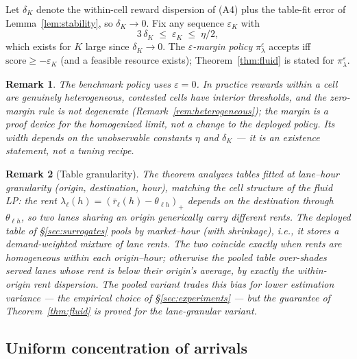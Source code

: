 \documentclass[11pt]{article}
\newtheorem{remark}{Remark}
\newcommand{\pol}{\pi_{\lambda}}
\begin{document}
Let $\delta_K$ denote the within-cell reward dispersion of (A4) plus
the table-fit error of Lemma~\ref{lem:stability}, so
$\delta_K \to 0$. Fix any sequence $\varepsilon_K$ with
\begin{equation}
  3\,\delta_K \;\leq\; \varepsilon_K \;\leq\; \eta / 2,
  \label{eq:margincond}
\end{equation}
which exists for $K$ large since $\delta_K \to 0$. The
\emph{$\varepsilon$-margin policy} $\pol^{\varepsilon}$ accepts iff
$\mathrm{score} \geq -\varepsilon_K$ (and a feasible resource exists);
Theorem~\ref{thm:fluid} is stated for $\pol^{\varepsilon}$.

\begin{remark}
The benchmark policy uses $\varepsilon = 0$. In practice rewards within
a cell are genuinely heterogeneous, contested cells have interior
thresholds, and the zero-margin rule is not degenerate
(Remark~\ref{rem:heterogeneous}); the margin is a proof device for the
homogenized limit, not a change to the deployed policy. Its width
depends on the unobservable constants $\eta$ and $\delta_K$ --- it is
an existence statement, not a tuning recipe.
\end{remark}

\begin{remark}[Table granularity]
\label{rem:granularity}
The theorem analyzes tables fitted at \emph{lane--hour} granularity
(origin, destination, hour), matching the cell structure of the fluid
LP: the rent $\lambda_{\ell}(h) = (\bar{r}_{\ell}(h) -
\theta_{\ell h})_+$ depends on the destination through
$\theta_{\ell h}$, so two lanes sharing an origin generically carry
different rents. The deployed table of \S\ref{sec:surrogates} pools
by \emph{market--hour} (with shrinkage), i.e., it stores a
demand-weighted mixture of lane rents. The two coincide exactly when
rents are homogeneous within each origin--hour; otherwise the pooled
table over-shades served lanes whose rent is below their origin's
average, by exactly the within-origin rent dispersion. The pooled
variant trades this bias for lower estimation variance --- the
empirical choice of \S\ref{sec:experiments} --- but the guarantee of
Theorem~\ref{thm:fluid} is proved for the lane-granular variant.
\end{remark}

\subsection{Uniform concentration of arrivals}
\end{document}
